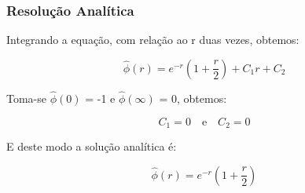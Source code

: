 \documentclass[12pt, a4paper]{article} %
\begin{document}
        \subsubsection{Resolu\c{c}\~ao Anal\'itica}

            Integrando a equa\c{c}\~ao, com rela\c{c}\~ao ao r duas vezes, obtemos:

            \begin{equation*}
                \hat{\phi}(r) = e^{-r}\left(1 + \frac{r}{2}\right) + C_{1}r + C_{2}
            \end{equation*}

            Toma-se $\hat{\phi}(0)$ = -1 e $\hat{\phi}(\infty)$ = 0, obtemos:

            \begin{equation*}
                C_{1} = 0 \quad \text{e} \quad C_{2} = 0
            \end{equation*}
            
            E deste modo a solu\c{c}\~ao anal\'itica \'e:

            \begin{equation*}
                \hat{\phi}(r) = e^{-r}\left(1 + \frac{r}{2}\right)
            \end{equation*}
\end{document}
